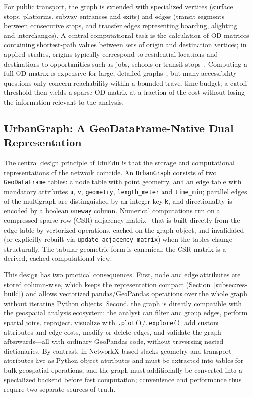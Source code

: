 \documentclass[smartcities,article,submit,moreauthors]{Definitions/mdpi}
\begin{document}
    For public transport, the graph is extended with specialized vertices (surface stops, platforms,
    subway entrances and exits) and edges (transit segments between consecutive stops, and transfer
    edges representing boarding, alighting and interchanges).
    A central computational task is the calculation of OD matrices containing shortest-path values
    between sets of origin and destination vertices; in applied studies, origins typically correspond to
    residential locations and destinations to opportunities such as jobs, schools or transit
    stops~\cite{foti2014pandana,liu2022accessibility}.
    Computing a full OD matrix is expensive for large, detailed graphs~\cite{kwan1998accessibility}, but
    many accessibility questions only concern reachability within a bounded travel-time budget; a cutoff
    threshold then yields a sparse OD matrix at a fraction of the cost without losing the information
    relevant to the analysis.

    \subsection{UrbanGraph: A GeoDataFrame-Native Dual Representation}
    \label{subsec:urban_graph}

    The central design principle of IduEdu is that the storage and computational representations of the
    network coincide.
    An \texttt{UrbanGraph} consists of two \texttt{GeoDataFrame} tables: a node table with point
    geometry, and an edge table with mandatory attributes \texttt{u}, \texttt{v}, \texttt{geometry},
    \texttt{length\_meter} and \texttt{time\_min}; parallel edges of the multigraph are distinguished by
    an integer key \texttt{k}, and directionality is encoded by a boolean \texttt{oneway} column.
    Numerical computations run on a compressed sparse row (CSR) adjacency
    matrix~\cite{virtanen2020scipy} that is built directly from the edge table by vectorized operations,
    cached on the graph object, and invalidated (or explicitly rebuilt via
    \texttt{update\_adjacency\_matrix}) when the tables change structurally.
    The tabular geometric form is canonical; the CSR matrix is a derived, cached computational view.

    This design has two practical consequences.
    First, node and edge attributes are stored column-wise, which keeps the representation compact
    (Section~\ref{subsec:res-build}) and allows vectorized pandas/GeoPandas operations over the whole
    graph without iterating Python objects.
    Second, the graph is directly compatible with the geospatial analysis ecosystem: the analyst can
    filter and group edges, perform spatial joins, reproject, visualize with
    \texttt{.plot()}/\texttt{.explore()}, add custom attributes and edge costs, modify or delete edges,
    and validate the graph afterwards---all with ordinary GeoPandas code, without traversing nested
    dictionaries.
    By contrast, in NetworkX-based stacks geometry and transport attributes live as Python object
    attributes and must be extracted into tables for bulk geospatial operations, and the graph must
    additionally be converted into a specialized backend before fast computation; convenience and
    performance thus require two separate sources of truth.
\end{document}
